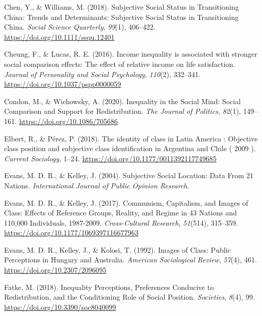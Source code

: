 \documentclass[
  12pt,
]{book}
\newlength{\cslhangindent}
\newlength{\cslentryspacingunit} %
\newenvironment{CSLReferences}[2] %
 {%
  \setlength{\parindent}{0pt}
  \ifodd #1
  \let\oldpar\par
  \def\par{\hangindent=\cslhangindent\oldpar}
  \fi
  \setlength{\parskip}{#2\cslentryspacingunit}
 }%
 {}
\begin{document}
\begin{CSLReferences}{1}{0}
\leavevmode{}%
Chen, Y., \& Williams, M. (2018). Subjective {Social Status} in {Transitioning China}: {Trends} and {Determinants}: {Subjective Social Status} in {Transitioning China}. \emph{Social Science Quarterly}, \emph{99}(1), 406--422. \url{https://doi.org/10.1111/ssqu.12401}

\leavevmode{}%
Cheung, F., \& Lucas, R. E. (2016). Income inequality is associated with stronger social comparison effects: {The} effect of relative income on life satisfaction. \emph{Journal of Personality and Social Psychology}, \emph{110}(2), 332--341. \url{https://doi.org/10.1037/pspp0000059}

\leavevmode{}%
Condon, M., \& Wichowsky, A. (2020). Inequality in the {Social Mind}: {Social Comparison} and {Support} for {Redistribution}. \emph{The Journal of Politics}, \emph{82}(1), 149--161. \url{https://doi.org/10.1086/705686}

\leavevmode{}%
Elbert, R., \& Pérez, P. (2018). The identity of class in {Latin America} : {Objective} class position and subjective class identification in {Argentina} and {Chile} ( 2009 ). \emph{Current Sociology}, 1--24. \url{https://doi.org/10.1177/0011392117749685}

\leavevmode{}%
Evans, M. D. R., \& Kelley, J. (2004). Subjective {Social Location}: {Data From} 21 {Nations}. \emph{International Journal of Public Opinion Research}.

\leavevmode{}%
Evans, M. D. R., \& Kelley, J. (2017). Communism, {Capitalism}, and {Images} of {Class}: {Effects} of {Reference Groups}, {Reality}, and {Regime} in 43 {Nations} and 110,000 {Individuals}, 1987-2009. \emph{Cross-Cultural Research}, \emph{51}(514), 315--359. \url{https://doi.org/10.1177/1069397116677963}

\leavevmode{}%
Evans, M. D. R., Kelley, J., \& Kolosi, T. (1992). Images of {Class}: {Public Perceptions} in {Hungary} and {Australia}. \emph{American Sociological Review}, \emph{57}(4), 461. \url{https://doi.org/10.2307/2096095}

\leavevmode{}%
Fatke, M. (2018). Inequality {Perceptions}, {Preferences Conducive} to {Redistribution}, and the {Conditioning Role} of {Social Position}. \emph{Societies}, \emph{8}(4), 99. \url{https://doi.org/10.3390/soc8040099}


\end{CSLReferences}
\end{document}
